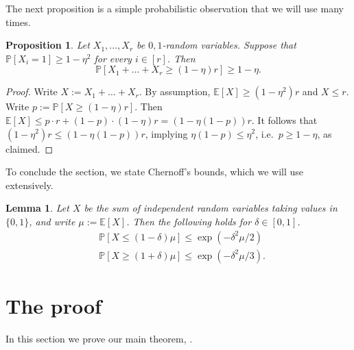 \documentclass[english]{article}
\theoremstyle{plain}
\newtheorem{lemma}[theorem]{Lemma}
\newtheorem{proposition}[theorem]{Proposition}
\theoremstyle{remark}
\def\Ex{\mathbb{E}}
\renewcommand{\Pr}{\mathbb{P}}
\begin{document}
	The next proposition is a simple probabilistic observation that we will use many times.

	\begin{proposition} \label{prop:markov}
		Let $X_1, \ldots, X_r$ be $0,1$-random variables. Suppose that $\Pr[X_i = 1] \ge 1 - \eta^2$ for every $i \in [r]$. Then 
		\begin{equation*}
			\Pr[X_1 + \ldots + X_r \ge (1 - \eta)r] \ge 1 - \eta.
		\end{equation*}
	\end{proposition}

	\begin{proof}
		Write $X := X_1 + \ldots + X_r$.
		By assumption, $\Ex[X] \ge (1 - \eta^2)r$ and $X \le r$. Write $p := \Pr[X \ge (1 - \eta)r]$. Then $\Ex[X] \le p \cdot r + (1 - p) \cdot (1 - \eta)r = (1 - \eta(1 - p)) r$. It follows that $(1 - \eta^2)r \le (1 - \eta(1 - p))r$, implying $\eta(1 - p) \le \eta^2$, i.e.\ $p \ge 1 - \eta$, as claimed.
	\end{proof}

	To conclude the section, we state Chernoff's bounds, which we will use extensively.

	\begin{lemma} \label{lem:chernoff}
		Let $X$ be the sum of independent random variables taking values in $\{0, 1\}$, and write $\mu := \Ex[X]$. Then the following holds for $\delta \in [0, 1]$.
		\begin{align*}
			& \Pr[X \le (1-\delta)\mu] \le \exp(-\delta^2 \mu / 2) \\
			& \Pr[X \ge (1+\delta)\mu] \le \exp(-\delta^2 \mu / 3).
		\end{align*}
	\end{lemma}

\section{The proof} \label{sec:proof}

	In this section we prove our main theorem, .
\end{document}
